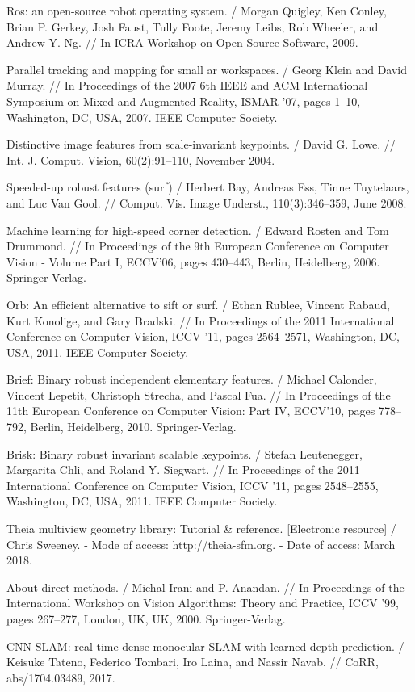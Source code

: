 \begin{thebibliography}{30}
    Ros: an open-source robot operating system. /
    Morgan Quigley, Ken Conley, Brian P. Gerkey, Josh Faust, Tully Foote, Jeremy Leibs, Rob Wheeler, and Andrew Y. Ng. //
    In ICRA Workshop on Open Source Software, 2009.

    Parallel tracking and mapping for small ar workspaces. /
    Georg Klein and David Murray. //
    In Proceedings of the 2007 6th IEEE and ACM International Symposium on Mixed and Augmented Reality,
    ISMAR ’07, pages 1–10, Washington, DC, USA, 2007. IEEE Computer Society.

    Distinctive image features from scale-invariant keypoints. /
    David G. Lowe. //
    Int. J. Comput. Vision, 60(2):91–110, November 2004.

    Speeded-up robust features (surf) /
    Herbert Bay, Andreas Ess, Tinne Tuytelaars, and Luc Van Gool. //
    Comput. Vis. Image Underst., 110(3):346–359, June 2008.

    Machine learning for high-speed corner detection. /
    Edward Rosten and Tom Drummond. //
    In Proceedings of the 9th European Conference on Computer Vision -
    Volume Part I, ECCV’06, pages 430–443, Berlin, Heidelberg, 2006. Springer-Verlag.

    Orb: An efficient alternative to sift or surf. /
    Ethan Rublee, Vincent Rabaud, Kurt Konolige, and Gary Bradski. //
    In Proceedings of the 2011 International Conference on Computer Vision,
    ICCV ’11, pages 2564–2571, Washington, DC, USA, 2011. IEEE Computer Society.

    Brief: Binary robust independent elementary features. /
    Michael Calonder, Vincent Lepetit, Christoph Strecha, and Pascal Fua. //
    In Proceedings of the 11th European Conference on Computer Vision:
    Part IV, ECCV’10, pages 778–792, Berlin, Heidelberg, 2010. Springer-Verlag.

    Brisk: Binary robust invariant scalable keypoints. /
    Stefan Leutenegger, Margarita Chli, and Roland Y. Siegwart. //
    In Proceedings of the 2011 International Conference on Computer Vision,
    ICCV ’11, pages 2548–2555, Washington, DC, USA, 2011. IEEE Computer Society.

    Theia multiview geometry library: Tutorial \& reference.
    [Electronic resource] / Chris Sweeney. - Mode of access: http://theia-sfm.org.
    - Date of access: March 2018.

    About direct methods. / Michal Irani and P. Anandan. //
    In Proceedings of the International Workshop on Vision Algorithms: Theory and Practice,
    ICCV ’99, pages 267–277, London, UK, UK, 2000. Springer-Verlag.

    CNN-SLAM: real-time dense monocular SLAM with learned depth prediction. /
    Keisuke Tateno, Federico Tombari, Iro Laina, and Nassir Navab. // CoRR, abs/1704.03489, 2017.

\end{thebibliography}
\endgroup
